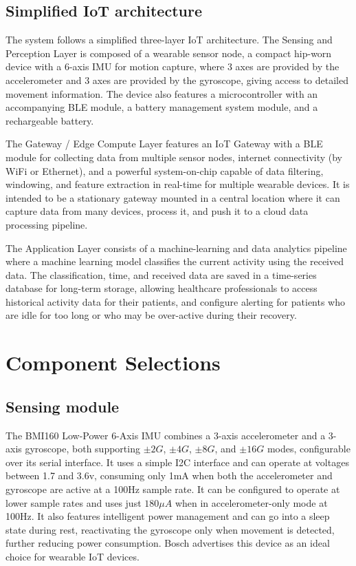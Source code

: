 \documentclass[conference]{IEEEtran}
\begin{document}
\subsection{Simplified IoT architecture}

The system follows a simplified three-layer IoT architecture. The Sensing and Perception Layer is composed of a wearable sensor node, a compact hip-worn device with a 6-axis IMU for motion capture, where 3 axes are provided by the accelerometer and 3 axes are provided by the gyroscope, giving access to detailed movement information. The device also features a microcontroller with an accompanying BLE module, a battery management system module, and a rechargeable battery.

The Gateway / Edge Compute Layer features an IoT Gateway with a BLE module for collecting data from multiple sensor nodes, internet connectivity (by WiFi or Ethernet), and a powerful system-on-chip capable of data filtering, windowing, and feature extraction in real-time for multiple wearable devices. It is intended to be a stationary gateway mounted in a central location where it can capture data from many devices, process it, and push it to a cloud data processing pipeline.

The Application Layer consists of a machine-learning and data analytics pipeline where a machine learning model classifies the current activity using the received data. The classification, time, and received data are saved in a time-series database for long-term storage, allowing healthcare professionals to access historical activity data for their patients, and configure alerting for patients who are idle for too long or who may be over-active during their recovery.

\section{Component Selections}\label{components}

\subsection{Sensing module}
The BMI160 Low-Power 6-Axis IMU\cite{BMI160} combines a 3-axis accelerometer and a 3-axis gyroscope, both supporting $\pm2G$, $\pm4G$, $\pm8G$, and $\pm16G$ modes, configurable over its serial interface. It uses a simple I2C interface and can operate at voltages between 1.7 and 3.6v, consuming only 1mA when both the accelerometer and gyroscope are active at a 100Hz sample rate. It can be configured to operate at lower sample rates and uses just $180\mu A$ when in accelerometer-only mode at 100Hz. It also features intelligent power management and can go into a sleep state during rest, reactivating the gyroscope only when movement is detected, further reducing power consumption. Bosch advertises this device as an ideal choice for wearable IoT devices.
\end{document}
